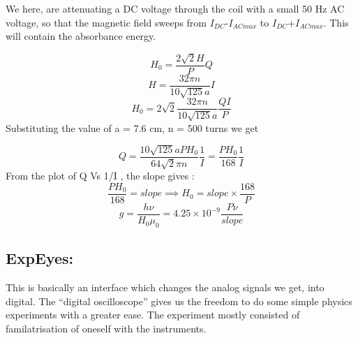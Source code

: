 \documentclass{multi}
\begin{document}
	We here, are attenuating a DC voltage through the coil with a small 50 Hz AC voltage, so that the magnetic field sweeps from $I_{DC}$-$I_{AC max}$ to $I_{DC}$+$I_{AC max}$. This will contain the absorbance energy.

	\begin{equation}
	H_0 = \frac{2\sqrt{2}H}{P}Q
	\end{equation}
	\begin{equation}\label{key}
	H=\frac{32\pi n}{10\sqrt{125}a}I
	\end{equation}
	\begin{equation}\label{key}
	H_0=2\sqrt{2}\frac{32\pi n}{10\sqrt{125}a}\frac{QI}{P}
	\end{equation}
	Substituting the value of a = 7.6 cm, n = 500 turns we get

	\begin{equation}\label{key}
	Q=\frac{10\sqrt{125}a PH_0}{64\sqrt{2}\pi n }\frac{1}{I}=\frac{PH_0}{168}\frac{1}{I} 
	\end{equation}
	From the plot of Q Vs 1/I , the slope gives : 
	\begin{equation}\label{key}
	 \frac{PH_0}{168}=slope \implies H_0=slope \times \frac{168}{P}
	\end{equation}
	\begin{equation}\label{eq}
	g=\frac{h \nu}{H_0 \mu_0} = 4.25\times10^{-9} \frac{P \nu}{slope}
	\end{equation}
\subsection{ExpEyes:}
	This is basically an interface which changes the analog signals we get, into digital. The ``digital oscilloscope'' gives us the freedom to do some simple physics experiments with a greater ease. The experiment mostly consisted of familatrisation of oneself with the instruments.
\end{document}
